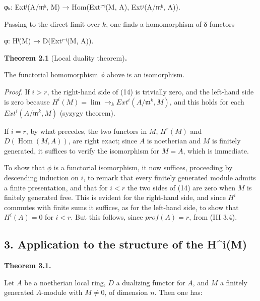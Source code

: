 \documentclass[
]{article}
\newenvironment{Shaded}{}{}
\newcommand{\NormalTok}[1]{#1}
\begin{document}
\begin{Shaded}
\begin{Highlighting}[]
\NormalTok{φₖ: Extⁱ(A/𝔪ᵏ, M) → Hom(Extʳ⁻ⁱ(M, A), Extʳ(A/𝔪ᵏ, A)).}
\end{Highlighting}
\end{Shaded}

Passing to the direct limit over \(k\), one finds a homomorphism of
δ-functors

\begin{Shaded}
\begin{Highlighting}[]
\NormalTok{φ: Hⁱ(M) → D(Extʳ⁻ⁱ(M, A)).}
\end{Highlighting}
\end{Shaded}

\textbf{Theorem 2.1} (Local duality theorem)\textbf{.}

The functorial homomorphism \(\phi\) above is an isomorphism.

\emph{Proof.} If \(i > r\), the right-hand side of (14) is trivially
zero, and the left-hand side is zero because
\(H^{i}(M) = \lim\to_{k} Ext^{i}(A/\mathfrak{m}^{k}, M)\), and this
holds for each \(Ext^{i}(A/\mathfrak{m}^{k}, M)\) (syzygy theorem).

If \(i = r\), by what precedes, the two functors in \(M\), \(H^{r}(M)\)
and \(D(\operatorname{Hom}(M, A))\), are right exact; since \(A\) is
noetherian and \(M\) is finitely generated, it suffices to verify the
isomorphism for \(M = A\), which is immediate.

To show that \(\phi\) is a functorial isomorphism, it now suffices,
proceeding by descending induction on \(i\), to remark that every
finitely generated module admits a finite presentation, and that for
\(i < r\) the two sides of (14) are zero when \(M\) is finitely
generated free. This is evident for the right-hand side, and since
\(H^{i}\) commutes with finite sums it suffices, as for the left-hand
side, to show that \(H^{i}(A) = 0\) for \(i < r\). But this follows,
since \(prof(A) = r\), from (III 3.4).

\subsection{3. Application to the structure of the
H\^{}i(M)}\label{application-to-the-structure-of-the-him}

\textbf{Theorem 3.1.}

Let \(A\) be a noetherian local ring, \(D\) a dualizing functor for
\(A\), and \(M\) a finitely generated \(A\)-module with \(M \neq 0\), of
dimension \(n\). Then one has:
\end{document}
